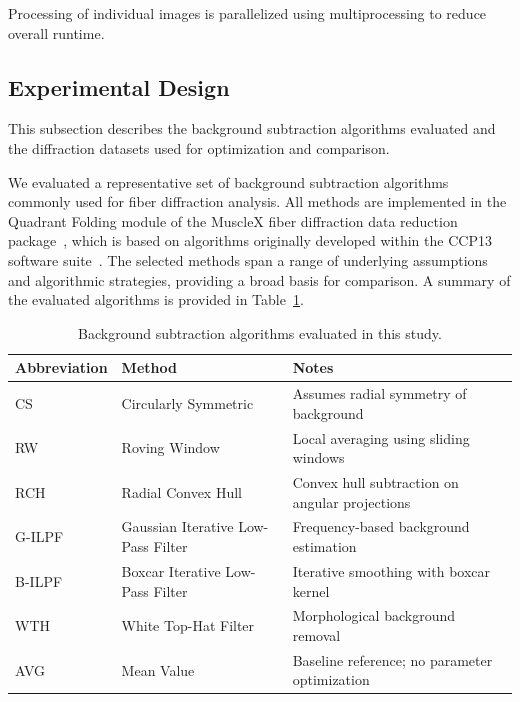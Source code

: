 \documentclass[iucr]{iucrjournals}
\begin{document}
Processing of individual images is parallelized using multiprocessing to reduce overall runtime.





\subsection{Experimental Design}

This subsection describes the background subtraction algorithms evaluated and the diffraction datasets used for optimization and comparison.

We evaluated a representative set of background subtraction algorithms commonly used for fiber diffraction analysis. All methods are implemented in the Quadrant Folding module of the MuscleX fiber diffraction data reduction package~\cite{JiratrakanvongEtAl2024}, which is based on algorithms originally developed within the CCP13 software suite~\cite{HeEtAl2007}. The selected methods span a range of underlying assumptions and algorithmic strategies, providing a broad basis for comparison. A summary of the evaluated algorithms is provided in Table~\ref{tab:algorithms}.

\begin{table}[t]
\caption{Background subtraction algorithms evaluated in this study.}
\label{tab:algorithms}
\centering
\small
\setlength{\tabcolsep}{6pt}
\renewcommand{\arraystretch}{1.1}
\begin{tabular}{@{}lll@{}}
\toprule
\textbf{Abbreviation} & \textbf{Method} & \textbf{Notes} \\
\midrule
CS & Circularly Symmetric & Assumes radial symmetry of background \\
RW & Roving Window & Local averaging using sliding windows \\
RCH & Radial Convex Hull & Convex hull subtraction on angular projections \\
G-ILPF & Gaussian Iterative Low-Pass Filter & Frequency-based background estimation \\
B-ILPF & Boxcar Iterative Low-Pass Filter & Iterative smoothing with boxcar kernel \\
WTH & White Top-Hat Filter & Morphological background removal \\
AVG & Mean Value & Baseline reference; no parameter optimization \\
\bottomrule
\end{tabular}
\end{table}
\end{document}
